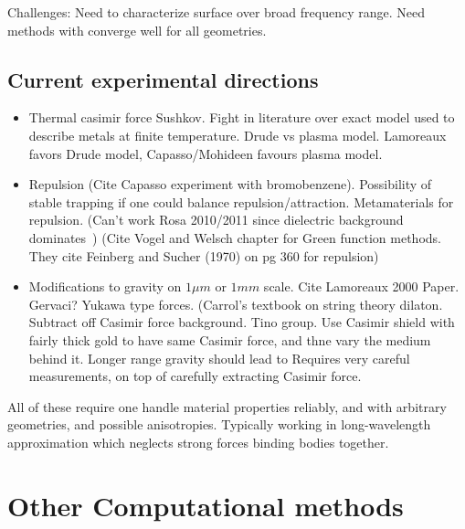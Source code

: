 Challenges:  Need to characterize surface over broad frequency range.
Need methods with converge well for all geometries.  

\subsection{Current experimental directions}
\begin{itemize}
\item Thermal casimir force
Sushkov\cite{Sushkov2011}.
Fight in literature over exact model used to describe metals at finite temperature.
Drude vs plasma model.  
 Lamoreaux favors Drude model, Capasso/Mohideen favours plasma model.
\item Repulsion (Cite Capasso experiment with bromobenzene).  Possibility of stable trapping
  if one could balance repulsion/attraction.  
 Metamaterials for repulsion.  (Can't work Rosa 2010/2011 since dielectric
  background dominates~\cite{Rosa2008})
  (Cite Vogel and Welsch chapter for Green function methods.  They cite 
  Feinberg and Sucher (1970) on pg 360 for repulsion)
\item Modifications to gravity on $1\mu m$ or $1mm$ scale.  Cite Lamoreaux 2000 Paper.  Gervaci?
Yukawa type forces.  (Carrol's textbook on string theory dilaton.  
 Subtract off Casimir force background.
  Tino group.
  Use Casimir shield with fairly thick gold to have same Casimir force, and thne vary the medium behind it.
  Longer range gravity should lead to 
Requires very careful measurements, on top of carefully extracting Casimir force.   
\end{itemize}
All of these require one handle material properties reliably, and with arbitrary geometries,
and possible anisotropies.  Typically working in long-wavelength approximation which neglects strong
forces binding bodies together.    



\section{Other Computational methods}

